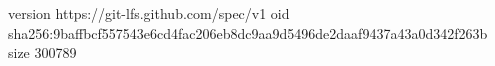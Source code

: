 version https://git-lfs.github.com/spec/v1
oid sha256:9baffbcf557543e6cd4fac206eb8dc9aa9d5496de2daaf9437a43a0d342f263b
size 300789
